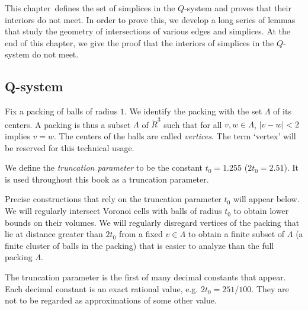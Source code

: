 This chapter\ defines the set of simplices in the $Q$-system and
proves that their interiors do not meet.  In order to prove this,
we develop a long series of lemmas that study the geometry of
intersections of various edges and simplices.  At the end of this
chapter, we give the proof that the interiors of simplices in the
$Q$-system do not meet.


\subsection{Q-system}
\label{sec:Q-describe}
\label{sec:construction}



Fix a packing of balls of radius $1$. We identify the packing with
the set $\Lambda$ of its centers.  A packing is thus a subset
$\Lambda$ of $\ring{R}^3$ such that for all $v,w\in\Lambda$,
$|v-w|<2$ implies $v=w$. The centers of the balls are called {\it
{} vertices}. The term `vertex' will be reserved for
this technical usage.  


\begin{definition}  We define the {\it truncation parameter}
 to be the constant
$t_0=1.255$ ($2t_0 = 2.51$). It is used throughout this book as
a truncation parameter.
\end{definition}

\bigskip



Precise constructions that rely on the truncation parameter $t_0$
will appear below.  We will regularly intersect Voronoi cells with
balls of radius $t_0$ to obtain lower bounds on their volumes.  We
will regularly disregard vertices of the packing that lie at
distance greater than $2t_0$ from a fixed $v\in\Lambda$ to obtain
a finite subset of $\Lambda$ (a finite cluster of balls in the
packing) that is easier to analyze than the full packing
$\Lambda$.

The truncation parameter is the first of many decimal constants
that appear. Each decimal constant is an exact rational value,
e.g. $2t_0 = 251/100$.  They are not to be regarded as
approximations of some other value.

